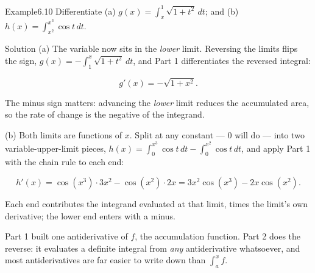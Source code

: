 \documentclass[a4paper,12pt,oneside]{memoir}
\begin{document}
\begin{workedexample}
\begin{envexample}{Example}{6.10}{}
Differentiate (a) \(\displaystyle g(x) = \int_{x}^{1} \sqrt{1 + t^{2}}\,dt\); and (b) \(\displaystyle h(x) = \int_{x^{2}}^{x^{3}} \cos t\,dt\).
\end{envexample}
\begin{envsolution}{Solution}{}{}
(a) The variable now sits in the \emph{lower} limit. Reversing the limits flips the sign, \(g(x) = -\int_{1}^{x} \sqrt{1 + t^{2}}\,dt\), and Part 1 differentiates the reversed integral:

\[ g'(x) = -\sqrt{1 + x^{2}}. \]

The minus sign matters: advancing the \emph{lower} limit reduces the accumulated area, so the rate of change is the negative of the integrand.

(b) Both limits are functions of \(x\). Split at any constant — \(0\) will do — into two variable-upper-limit pieces, \(h(x) = \int_{0}^{x^{3}} \cos t\,dt - \int_{0}^{x^{2}} \cos t\,dt\), and apply Part 1 with the chain rule to each end:

\[ h'(x) = \cos(x^{3})\cdot 3x^{2} - \cos(x^{2})\cdot 2x = 3x^{2}\cos(x^{3}) - 2x\cos(x^{2}). \]

Each end contributes the integrand evaluated at that limit, times the limit’s own derivative; the lower end enters with a minus. \qedmark
\end{envsolution}
\end{workedexample}
Part 1 built one antiderivative of \(f\), the accumulation function. Part 2 does the reverse: it evaluates a definite integral from \emph{any} antiderivative whatsoever, and most antiderivatives are far easier to write down than \(\int_{a}^{x} f\).
\end{document}
